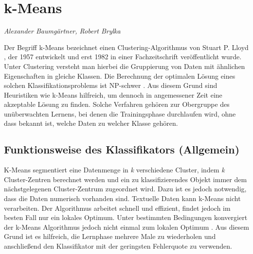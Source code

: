\section{k-Means}
\label{mainsec:kmeans}
\textit{Alexander Baumgärtner, Robert Brylka}

Der Begriff k-Means bezeichnet einen Clustering-Algorithmus von Stuart P. Lloyd \cite{Lloyd}, der 1957 entwickelt und erst 1982 in einer Fachzeitschrift veröffentlicht wurde. Unter Clustering versteht man hierbei die Gruppierung von Daten mit ähnlichen Eigenschaften in gleiche Klassen. Die Berechnung der optimalen Lösung eines solchen Klassifikationsproblems ist NP-schwer \cite{kMeansNPhard}. Aus diesem Grund sind Heuristiken wie k-Means hilfreich, um dennoch in angemessener Zeit eine akzeptable Lösung zu finden.
Solche Verfahren gehören zur Obergruppe des unüberwachten Lernens, bei denen die Trainingsphase durchlaufen wird, ohne dass 
bekannt ist, welche Daten zu welcher Klasse gehören.

\subsection{Funktionsweise des Klassifikators (Allgemein)} \label{subsec:kMeansFunktionsweise}
K-Means segmentiert eine Datenmenge in \emph{k} verschiedene Cluster, indem \emph{k} Cluster-Zentren berechnet werden und ein zu klassifizierendes Objekt immer dem nächstgelegenen Cluster-Zentrum zugeordnet wird. Dazu ist es jedoch notwendig, dass die Daten numerisch vorhanden sind. Textuelle Daten kann k-Means nicht verarbeiten.
Der Algorithmus arbeitet schnell und effizient, findet jedoch im besten Fall nur ein lokales Optimum. Unter bestimmten Bedingungen konvergiert der k-Means Algorithmus jedoch nicht einmal zum lokalen Optimum \cite{kMeansMinimum}. Aus diesem Grund ist es hilfreich, die Lernphase mehrere Male zu wiederholen und anschließend den Klassifikator mit der geringsten Fehlerquote zu verwenden.  

